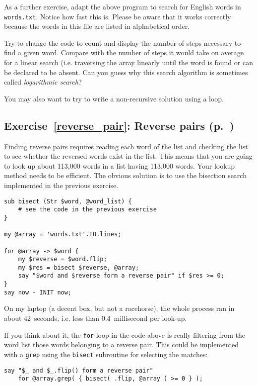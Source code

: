 As a further exercise, adapt the above program to 
search for English words in {\tt words.txt}. Notice 
how fast this is. Please 
be aware that it works correctly because the words 
in this file are listed in alphabetical order.

Try to change 
the code to count and display the number of steps 
necessary to find a given word. Compare with the number 
of steps it would take on average for a linear search 
(i.e. traversing the array linearly until the word 
is found or can be declared to be absent. Can you 
guess why this search algorithm is sometimes 
called \emph{logarithmic search}?

You may also want to try to write a non-recursive solution 
using a loop.


\subsection{Exercise~\ref{reverse_pair}: Reverse pairs (p.~\pageref{reverse_pair})}
\label{sol_reverse_pair}

Finding reverse pairs requires reading each word of 
the list and checking the list to see whether the reversed 
words exist in the list. This means that you are 
going to look up about 113,000 words in a list having 
113,000 words. Your lookup method needs to be efficient.
The obvious solution is to use the bisection search 
implemented in the previous exercise.

\begin{verbatim}
sub bisect (Str $word, @word_list) {
    # see the code in the previous exercise
}

my @array = 'words.txt'.IO.lines;

for @array -> $word {
    my $reverse = $word.flip;
    my $res = bisect $reverse, @array;
    say "$word and $reverse form a reverse pair" if $res >= 0;
}
say now - INIT now;
\end{verbatim}

On my laptop (a decent box, but not a racehorse), 
the whole process ran in about 42~seconds, i.e. 
less than 0.4~millisecond per look-up.

If you think about it, the {\tt for} loop in the code 
above is really filtering from the word list those words 
belonging to a reverse pair. This could be implemented 
with a {\tt grep} using the {\tt bisect} subroutine for 
selecting the matches:

\begin{verbatim}
say "$_ and $_.flip() form a reverse pair" 
    for @array.grep( { bisect( .flip, @array ) >= 0 } );
\end{verbatim}

